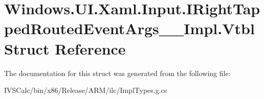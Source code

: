 \hypertarget{struct_windows_1_1_u_i_1_1_xaml_1_1_input_1_1_i_right_tapped_routed_event_args_____impl_1_1_vtbl}{}\section{Windows.\+U\+I.\+Xaml.\+Input.\+I\+Right\+Tapped\+Routed\+Event\+Args\+\_\+\+\_\+\+Impl.\+Vtbl Struct Reference}
\label{struct_windows_1_1_u_i_1_1_xaml_1_1_input_1_1_i_right_tapped_routed_event_args_____impl_1_1_vtbl}


The documentation for this struct was generated from the following file\+:\begin{DoxyCompactItemize}
\item 
I\+V\+S\+Calc/bin/x86/\+Release/\+A\+R\+M/ilc/Impl\+Types.\+g.\+cs\end{DoxyCompactItemize}
